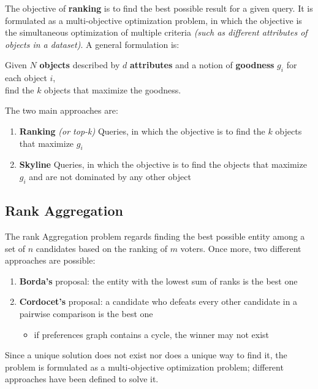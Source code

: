 \documentclass[english]{article}
\begin{document}
The objective of \textbf{ranking} is to find the best possible result for a given query.
It is formulated as a multi-objective optimization problem, in which the objective is the simultaneous optimization of multiple criteria \textit{(such as different attributes of objects in a dataset)}.
A general formulation is:

\begin{center}
  Given \(N\) \textbf{objects} described by \(d\) \textbf{attributes} and a notion of \textbf{goodness} \(g_i\) for each object \(i\),\\ find the \(k\) objects that maximize the goodness.
\end{center}

The two main approaches are:

\begin{enumerate}
  \item \textbf{Ranking} \textit{(or top-k)} Queries, in which the objective is to find the \(k\) objects that maximize \(g_i\)
  \item \textbf{Skyline} Queries, in which the objective is to find the objects that maximize \(g_i\) and are not dominated by any other object
\end{enumerate}

\subsection{Rank Aggregation}

The rank Aggregation problem regards finding the best possible entity among a set of \(n\) candidates based on the ranking of \(m\) voters.
Once more, two different approaches are possible:

\begin{enumerate}
  \item \textbf{Borda's} proposal: the entity with the lowest sum of ranks is the best one
  \item \textbf{Cordocet's} proposal: a candidate who defeats every other candidate in a pairwise comparison is the best one
        \begin{itemize}[label=\xmarkthin]
          \item if preferences graph contains a cycle, the winner may not exist
        \end{itemize}
\end{enumerate}

\bigskip
Since a unique solution does not exist nor does a unique way to find it, the problem is formulated as a multi-objective optimization problem;
different approaches have been defined to solve it.
\end{document}
